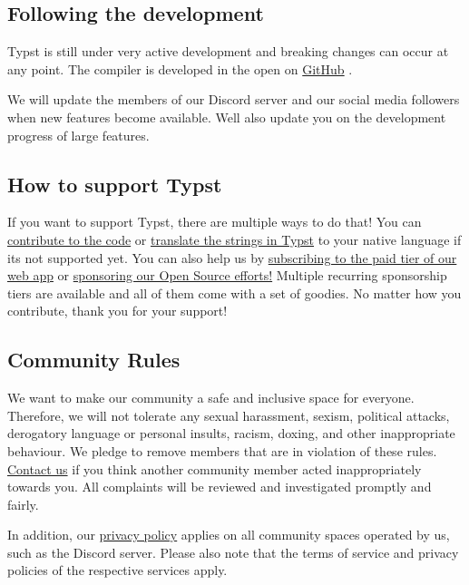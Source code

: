 \subsection{Following the development}\label{following-the-development}

Typst is still under very active development and breaking changes can
occur at any point. The compiler is developed in the open on
\href{https://github.com/typst/typst}{GitHub} .

We will update the members of our Discord server and our social media
followers when new features become available. We\textquotesingle ll also
update you on the development progress of large features.

\subsection{How to support Typst}\label{support-typst}

If you want to support Typst, there are multiple ways to do that! You
can \href{https://github.com/typst/typst}{contribute to the code} or
\href{https://github.com/search?q=repo\%3Atypst\%2Ftypst+impl+LocalName+for&type=code}{translate
the strings in Typst} to your native language if it\textquotesingle s
not supported yet. You can also help us by
\href{https://typst.app/pricing}{subscribing to the paid tier of our web
app} or \href{https://github.com/sponsors/typst}{sponsoring our Open
Source efforts!} Multiple recurring sponsorship tiers are available and
all of them come with a set of goodies. No matter how you contribute,
thank you for your support!

\subsection{Community Rules}\label{rules}

We want to make our community a safe and inclusive space for everyone.
Therefore, we will not tolerate any sexual harassment, sexism, political
attacks, derogatory language or personal insults, racism, doxing, and
other inappropriate behaviour. We pledge to remove members that are in
violation of these rules. \href{https://typst.app/contact/}{Contact us}
if you think another community member acted inappropriately towards you.
All complaints will be reviewed and investigated promptly and fairly.

In addition, our \href{https://typst.app/privacy/}{privacy policy}
applies on all community spaces operated by us, such as the Discord
server. Please also note that the terms of service and privacy policies
of the respective services apply.


